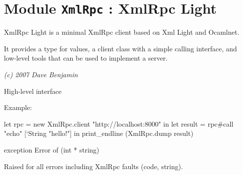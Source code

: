 \documentclass[11pt]{article}
\begin{document}
\tableofcontents
\section{Module {\tt{XmlRpc}} : XmlRpc Light}
\label{module:XmlRpc}



    XmlRpc Light is a minimal XmlRpc client based on Xml Light and Ocamlnet.


    It provides a type for values, a client class with a simple calling
    interface, and low-level tools that can be used to implement a server.


    {\it (c) 2007 Dave Benjamin}



\ocamldocvspace{0.5cm}



High-level interface



Example: \begin{ocamldoccode}

    let rpc = new XmlRpc.client "http://localhost:8000" in
    let result = rpc#call "echo" [`String "hello!"] in
    print_endline (XmlRpc.dump result) 
\end{ocamldoccode}




\label{exception:XmlRpc.Error}\begin{ocamldoccode}
exception Error of (int * string)
\end{ocamldoccode}
\begin{ocamldocdescription}
Raised for all errors including XmlRpc faults (code, string).


\end{ocamldocdescription}
\end{document}
